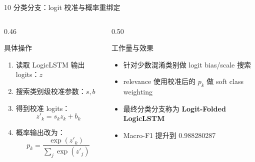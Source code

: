\documentclass[aspectratio=169]{beamer}
\newcommand{\tightitems}{\setlength{\itemsep}{0.32em}}
\begin{document}
\begin{frame}{10 分类分支：logit 校准与概率重绑定}
    \small
    \begin{columns}[T,onlytextwidth]
        \begin{column}{0.46\textwidth}
            \begin{block}{具体操作}
                \begin{enumerate}
                    \tightitems
                    \item 读取 LogicLSTM 输出 logits：$z$
                    \item 搜索类别级校准参数：$s,b$
                    \item 得到校准 logits：
                    \[
                        z'_k = s_k z_k + b_k
                    \]
                    \item 概率输出改为：
                    \[
                        p_k = \frac{\exp(z'_k)}{\sum_j\exp(z'_j)}
                    \]
                \end{enumerate}
            \end{block}
        \end{column}
        \begin{column}{0.50\textwidth}
            \begin{block}{工作量与效果}
                \begin{itemize}
                    \tightitems
                    \item 针对少数混淆类别做 logit bias/scale 搜索
                    \item relevance 使用校准后的 $p_k$ 做 soft class weighting
                    \item 最终分类分支称为 \textbf{Logit-Folded LogicLSTM}
                    \item Macro-F1 提升到 0.988280287
                \end{itemize}
            \end{block}
        \end{column}
    \end{columns}
\end{frame}
\end{document}

